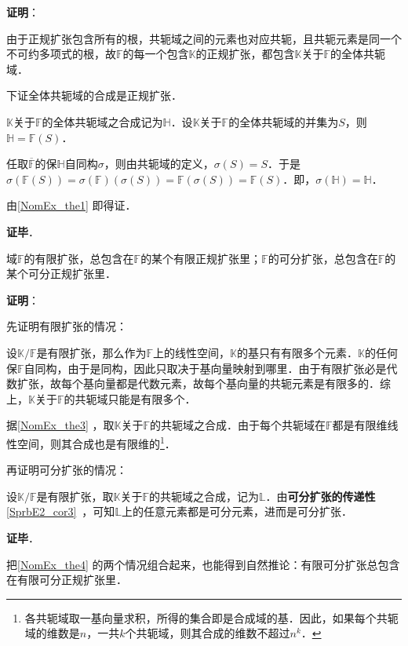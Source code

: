 \textbf{证明}：

由于正规扩张包含所有的根，共轭域之间的元素也对应共轭，且共轭元素是同一个不可约多项式的根，故$\mathbb{F}$的每一个包含$\mathbb{K}$的正规扩张，都包含$\mathbb{K}$关于$\mathbb{F}$的全体共轭域．

下证全体共轭域的合成是正规扩张．

$\mathbb{K}$关于$\mathbb{F}$的全体共轭域之合成记为$\mathbb{H}$．设$\mathbb{K}$关于$\mathbb{F}$的全体共轭域的并集为$S$，则$\mathbb{H}=\mathbb{F}(S)$．

任取$\overline{\mathbb{F}}$的保$\mathbb{H}$自同构$\sigma$，则由共轭域的定义，$\sigma(S)=S$．于是$\sigma(\mathbb{F}(S))=\sigma(\mathbb{F})(\sigma(S))=\mathbb{F}(\sigma(S))=\mathbb{F}(S)$．即，$\sigma(\mathbb{H})=\mathbb{H}$．

由\autoref{NomEx_the1} 即得证．

\textbf{证毕}．


\begin{theorem}{}\label{NomEx_the4}
域$\mathbb{F}$的有限扩张，总包含在$\mathbb{F}$的某个有限正规扩张里；$\mathbb{F}$的可分扩张，总包含在$\mathbb{F}$的某个可分正规扩张里．
\end{theorem}

\textbf{证明}：

先证明有限扩张的情况：

设$\mathbb{K}/\mathbb{F}$是有限扩张，那么作为$\mathbb{F}$上的线性空间，$\mathbb{K}$的基只有有限多个元素．$\mathbb{K}$的任何保$\mathbb{F}$自同构，由于是同构，因此只取决于基向量映射到哪里．由于有限扩张必是代数扩张，故每个基向量都是代数元素，故每个基向量的共轭元素是有限多的．综上，$\mathbb{K}$关于$\mathbb{F}$的共轭域只能是有限多个．

据\autoref{NomEx_the3} ，取$\mathbb{K}$关于$\mathbb{F}$的共轭域之合成．由于每个共轭域在$\mathbb{F}$都是有限维线性空间，则其合成也是有限维的\footnote{各共轭域取一基向量求积，所得的集合即是合成域的基．因此，如果每个共轭域的维数是$n$，一共$k$个共轭域，则其合成的维数不超过$n^k$．}．

再证明可分扩张的情况：

设$\mathbb{K}/\mathbb{F}$是有限扩张，取$\mathbb{K}$关于$\mathbb{F}$的共轭域之合成，记为$\mathbb{L}$．由\textbf{可分扩张的传递性}\autoref{SprbE2_cor3}~，可知$\mathbb{L}$上的任意元素都是可分元素，进而是可分扩张．

\textbf{证毕}．

把\autoref{NomEx_the4} 的两个情况组合起来，也能得到自然推论：有限可分扩张总包含在有限可分正规扩张里．


